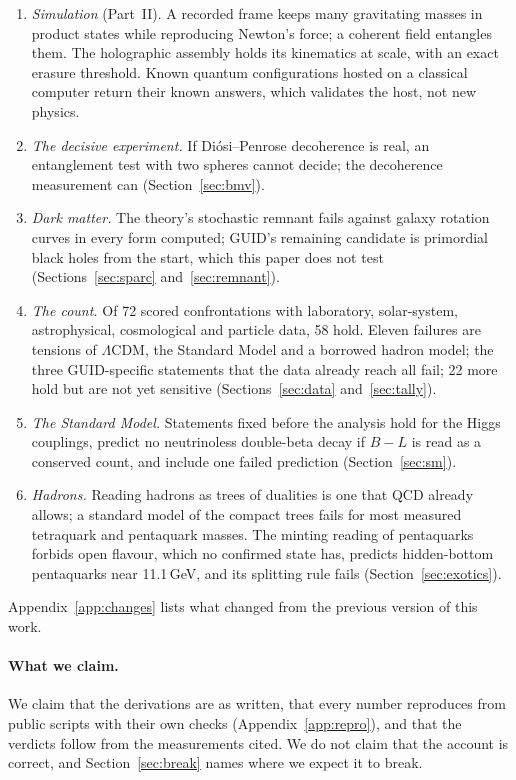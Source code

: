 \documentclass[11pt,a4paper]{article}
\begin{document}
\begin{enumerate}[nosep]
\item \emph{Simulation} (Part~II). A recorded frame keeps many gravitating masses in product states while reproducing Newton's force; a
coherent field entangles them. The holographic assembly holds its kinematics at scale, with an exact erasure threshold. Known quantum
configurations hosted on a classical computer return their known answers, which validates the host, not new physics.
\item \emph{The decisive experiment.} If Di\'osi--Penrose decoherence is real, an entanglement test with two spheres cannot decide; the
decoherence measurement can (Section~\ref{sec:bmv}).
\item \emph{Dark matter.} The theory's stochastic remnant fails against galaxy rotation curves in every form computed; GUID's remaining
candidate is primordial black holes from the start, which this paper does not test (Sections~\ref{sec:sparc} and~\ref{sec:remnant}).
\item \emph{The count.} Of 72 scored confrontations with laboratory, solar-system, astrophysical, cosmological and particle data, 58
hold. Eleven failures are tensions of $\Lambda$CDM, the Standard Model and a borrowed hadron model; the three GUID-specific statements that
the data already reach all fail; 22 more hold but are not yet sensitive (Sections~\ref{sec:data} and~\ref{sec:tally}).
\item \emph{The Standard Model.} Statements fixed before the analysis hold for the Higgs couplings, predict no neutrinoless double-beta
decay if $B-L$ is read as a conserved count, and include one failed prediction (Section~\ref{sec:sm}).
\item \emph{Hadrons.} Reading hadrons as trees of dualities is one that QCD already allows; a standard model of the compact trees fails for
most measured tetraquark and pentaquark masses. The minting reading of pentaquarks forbids open flavour, which no confirmed state has,
predicts hidden-bottom pentaquarks near 11.1\,GeV, and its splitting rule fails (Section~\ref{sec:exotics}).
\end{enumerate}
Appendix~\ref{app:changes} lists what changed from the previous version of this work.

\paragraph{What we claim.} We claim that the derivations are as written, that every number reproduces from public scripts with their
own checks (Appendix~\ref{app:repro}), and that the verdicts follow from the measurements cited. We do not claim that the account is
correct, and Section~\ref{sec:break} names where we expect it to break.
\end{document}
